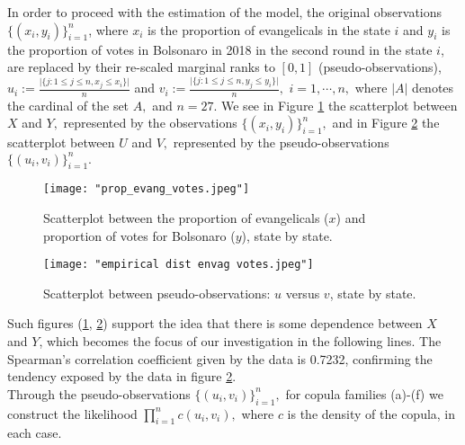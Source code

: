 \documentclass{aip-cp}
\begin{document}
 In order to proceed with the estimation of the model, the original observations $\{(x_{i}, y_{i})\}_{i=1}^n$, where $x_{i}$ is the proportion of evangelicals in the state $i$ and $y_{i}$ is the proportion of votes in Bolsonaro in 2018 in the second round in the state $i$, are replaced by their re-scaled marginal ranks to $[0,1]$ (pseudo-observations), $u_i := \frac{\vert \{j: 1 \leq j \leq n, x_{j} \leq x_{i} \} \vert }{n} $ and $v_i:=\frac{\vert \{j: 1\leq j \leq n, y_{j} \leq y_{i} \} \vert }{n},\,\, i=1,\cdots,n,$ where $|A|$ denotes the cardinal of the set $A,$ and $n=27.$ We see in Figure \ref{graf1} the scatterplot between $X$ and $Y,$ represented by the observations $\{(x_i,y_i)\}_{i=1}^n,$ and in Figure \ref{graf2} the scatterplot between $U$ and $V,$ represented by the pseudo-observations $\{(u_i,v_i)\}_{i=1}^n.$
\begin{figure}[!ht]
\caption{Scatterplot between the proportion of evangelicals ($x$) and proportion of votes for Bolsonaro ($y$), state by state.} \label{graf1}
\centering
\texttt{[image: "prop\_evang\_votes.jpeg"]}
\end{figure}
\begin{figure}[!ht]
\caption{Scatterplot between pseudo-observations: $u$ versus $v$, state by state.} \label{graf2}
\centering
\texttt{[image: "empirical dist envag votes.jpeg"]}
\end{figure}
Such figures (\ref{graf1}, \ref{graf2}) support the idea that there is some dependence between $X$ and $Y$, which becomes the focus of our investigation in the following lines. The Spearman's correlation coefficient given by the data is 0.7232, confirming the tendency exposed by the data in figure \ref{graf2}.\\
Through the pseudo-observations $\{(u_i,v_i)\}_{i=1}^n,$ for copula families (a)-(f) we construct the likelihood  $\prod_{i=1}^n c (u_i, v_i),$ where $c$ is the density of the copula, in each case.
\end{document}
